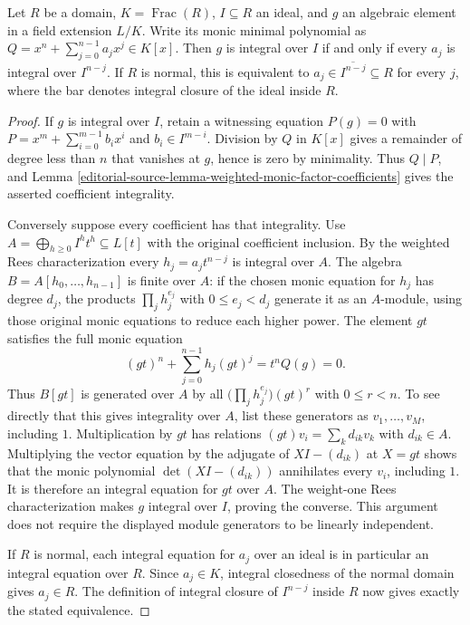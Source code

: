 \begin{lemma}
\label{editorial-source-lemma-integral-ideal-minimal-polynomial-criterion}
Let $R$ be a domain, $K=\operatorname{Frac}(R)$, $I\subseteq R$
an ideal, and $g$ an algebraic element in a field extension
$L/K$. Write its monic minimal polynomial as
$Q=x^n+\sum_{j=0}^{n-1}a_jx^j\in K[x]$.
Then $g$ is integral over $I$ if and only if every $a_j$ is
integral over $I^{n-j}$. If $R$ is normal, this is equivalent
to $a_j\in\overline{I^{n-j}}\subseteq R$ for every $j$,
where the bar denotes integral closure of the ideal inside $R$.
\end{lemma}

\begin{proof}
If $g$ is integral over $I$, retain a witnessing equation
$P(g)=0$ with $P=x^m+\sum_{i=0}^{m-1}b_ix^i$ and
$b_i\in I^{m-i}$. Division by $Q$ in $K[x]$ gives a
remainder of degree less than $n$ that vanishes at $g$, hence
is zero by minimality. Thus $Q\mid P$, and
Lemma \ref{editorial-source-lemma-weighted-monic-factor-coefficients} gives
the asserted coefficient integrality.

Conversely suppose every coefficient has that integrality.
Use $A=\bigoplus_{h\geq0}I^ht^h\subseteq L[t]$ with the
original coefficient inclusion. By the weighted Rees
characterization every $h_j=a_jt^{n-j}$ is integral over $A$.
The algebra $B=A[h_0,\ldots,h_{n-1}]$ is finite over $A$:
if the chosen monic equation for $h_j$ has degree $d_j$,
the products $\prod_jh_j^{e_j}$ with $0\leq e_j<d_j$
generate it as an $A$-module, using those original monic
equations to reduce each higher power. The element $gt$
satisfies the full monic equation
$$
(gt)^n+\sum_{j=0}^{n-1}h_j(gt)^j=t^nQ(g)=0.
$$
Thus $B[gt]$ is generated over $A$ by all
$\bigl(\prod_jh_j^{e_j}\bigr)(gt)^r$ with $0\leq r<n$.
To see directly that this gives integrality over $A$, list
these generators as $v_1,\ldots,v_M$, including $1$.
Multiplication by $gt$ has relations
$(gt)v_i=\sum_k d_{ik}v_k$ with $d_{ik}\in A$.
Multiplying the vector equation by the adjugate of
$XI-(d_{ik})$ at $X=gt$ shows that the monic polynomial
$\det(XI-(d_{ik}))$ annihilates every $v_i$, including $1$.
It is therefore an integral equation for $gt$ over $A$.
The weight-one Rees characterization makes $g$ integral over
$I$, proving the converse. This argument does not require
the displayed module generators to be linearly independent.

If $R$ is normal, each integral equation for $a_j$ over an
ideal is in particular an integral equation over $R$.
Since $a_j\in K$, integral closedness of the normal domain
gives $a_j\in R$. The definition of integral closure of
$I^{n-j}$ inside $R$ now gives exactly the stated equivalence.
\end{proof}

